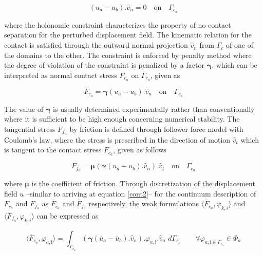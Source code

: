 \begin{equation}
 (u_a - u_b).\hat{v}_n = 0 \quad \mathrm{on} \quad \Gamma_{c_a}
\end{equation}

where the holonomic constraint characterizes the property of no contact separation for the perturbed displacement field.
The kinematic relation for the contact is satisfied through the outward normal projection $\hat{v}_n$ from $\Gamma_{c}$ of one of the domains to the other.
The constraint is enforced by penalty method where the degree of violation of the constraint is penalized by a factor $\boldsymbol{\gamma}$, which can be interpreted as normal contact stress $F_{c_a}$ on  $\Gamma_{c_a}$, given as

\begin{equation}
F_{c_a} = \boldsymbol{\gamma} (u_a - u_b).\hat{v}_n \quad \mathrm{on} \quad  \Gamma_{c_a} 
\end{equation}

The value of $\boldsymbol{\gamma}$ is usually determined experimentally rather than conventionally where it is sufficient to be high enough concerning numerical stability. The tangential stress $F_{f_a}$ by friction is defined through follower force model with Coulomb's law, where the stress is prescribed in the direction of motion $\hat{v}_t$ which is tangent to the contact stress $F_{c_a}$, given as follows

\begin{equation}
F_{f_a} =  \boldsymbol{\mu} (\boldsymbol{\gamma} (u_a - u_b).\hat{v}_n).\hat{v}_t \quad \mathrm{on} \quad \Gamma_{c_a} 
\end{equation}

where $\boldsymbol{\mu}$ is the coefficient of friction. Through discretization of the displacement field $u$ --similar to arriving at equation \eqref{cont2}-- for the continuum description of $F_{c_a}$ and $F_{f_a}$ as $\overline{F}_{c_a}$ and $\overline{F}_{f_a}$ respectively, the weak formulations $\langle \overline{F}_{c_a},\varphi_{k,i} \rangle$ and $\langle \overline{F}_{f_a},\varphi_{k,i} \rangle$ can be expressed as

\begin{equation}\label{cont_eqn}
\langle \overline{F}_{c_a},\varphi_{a,\mathrm{i}} \rangle = \int_{\Gamma_{c_a}}  (\boldsymbol{\gamma} (\overline{u}_a - \overline{u}_b).\hat{v}_n). \varphi_{a,\mathrm{i}}.\hat{v}_n\,\, d\Gamma_{c_a} \qquad \forall \varphi_{a,\mathrm{i} \in \Gamma_{c_a}} \in \Phi_a
\end{equation}

